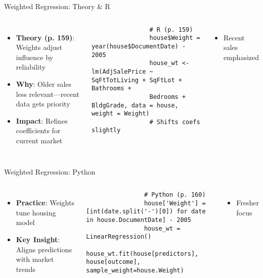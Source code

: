 \documentclass{beamer}
\begin{document}
	\begin{frame}[fragile]{Weighted Regression: Theory \& R}
		\begin{columns}
			\begin{itemize}
				\item \textbf{Theory (p. 159)}: Weights adjust influence by reliability
				\item \textbf{Why}: Older sales less relevant—recent data gets priority
				\item \textbf{Impact}: Refines coefficients for current market
			\end{itemize}
			\begin{lstlisting}
				# R (p. 159)
				house$Weight = year(house$DocumentDate) - 2005
				house_wt <- lm(AdjSalePrice ~ SqFtTotLiving + SqFtLot + Bathrooms +
				Bedrooms + BldgGrade, data = house, weight = Weight)
				# Shifts coefs slightly
			\end{lstlisting}
			\begin{itemize}
				\item Recent sales emphasized
			\end{itemize}
		\end{columns}
	\end{frame}
	
	\begin{frame}[fragile]{Weighted Regression: Python}
		\lstset{language=Python}
		\begin{columns}
			\column{0.6\textwidth}
			\begin{itemize}
				\item \textbf{Practice}: Weights tune housing model
				\item \textbf{Key Insight}: Aligns predictions with market trends
			\end{itemize}
			\begin{lstlisting}
				# Python (p. 160)
				house['Weight'] = [int(date.split('-')[0]) for date in house.DocumentDate] - 2005
				house_wt = LinearRegression()
				house_wt.fit(house[predictors], house[outcome], sample_weight=house.Weight)
			\end{lstlisting}
			\column{0.4\textwidth}
			\begin{itemize}
				\item Fresher focus
			\end{itemize}
		\end{columns}
	\end{frame}
	
\end{document}
